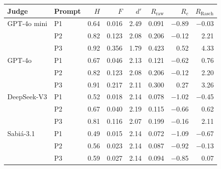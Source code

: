 \begin{tabular}{llrrrrrr}
\toprule
Judge & Prompt & $H$ & $F$ & $d'$ & $R_{\mathrm{raw}}$ & $R_c$ & $R_{\mathrm{Rasch}}$ \\
\midrule
GPT-4o mini & P1 & 0.64 & 0.016 & 2.49 & 0.091 & $-$0.89 & $-$0.03 \\
 & P2 & 0.82 & 0.123 & 2.08 & 0.206 & $-$0.12 & 2.21 \\
 & P3 & 0.92 & 0.356 & 1.79 & 0.423 & 0.52 & 4.33 \\
GPT-4o & P1 & 0.67 & 0.046 & 2.13 & 0.121 & $-$0.62 & 0.76 \\
 & P2 & 0.82 & 0.123 & 2.08 & 0.206 & $-$0.12 & 2.20 \\
 & P3 & 0.91 & 0.217 & 2.11 & 0.300 & 0.27 & 3.26 \\
DeepSeek-V3 & P1 & 0.52 & 0.018 & 2.14 & 0.078 & $-$1.02 & $-$0.45 \\
 & P2 & 0.67 & 0.040 & 2.19 & 0.115 & $-$0.66 & 0.62 \\
 & P3 & 0.81 & 0.116 & 2.07 & 0.199 & $-$0.16 & 2.11 \\
Sabiá-3.1 & P1 & 0.49 & 0.015 & 2.14 & 0.072 & $-$1.09 & $-$0.67 \\
 & P2 & 0.56 & 0.023 & 2.14 & 0.087 & $-$0.92 & $-$0.13 \\
 & P3 & 0.59 & 0.027 & 2.14 & 0.094 & $-$0.85 & 0.07 \\
\bottomrule
\end{tabular}

